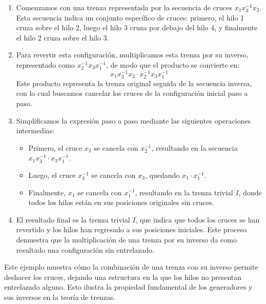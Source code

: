 \begin{enumerate}
    \item Comenzamos con una trenza representada por la secuencia de cruces \(x_1 x_3^{-1} x_2\). Esta secuencia indica un conjunto específico de cruces: primero, el hilo 1 cruza sobre el hilo 2, luego el hilo 3 cruza por debajo del hilo 4, y finalmente el hilo 2 cruza sobre el hilo 3.

    \item Para revertir esta configuración, multiplicamos esta trenza por su inverso, representado como \(x_2^{-1} x_3 x_1^{-1}\), de modo que el producto se convierte en:
    \[
    x_1 x_3^{-1} x_2 \cdot x_2^{-1} x_3 x_1^{-1}
    \]
    Este producto representa la trenza original seguida de la secuencia inversa, con lo cual buscamos cancelar los cruces de la configuración inicial paso a paso.

    \item Simplificamos la expresión paso a paso mediante las siguientes operaciones intermedias:
    
    \begin{itemize}
        \item Primero, el cruce \(x_2\) se cancela con \(x_2^{-1}\), resultando en la secuencia \(x_1 x_3^{-1} \cdot x_3 x_1^{-1}\).
        \item Luego, el cruce \(x_3^{-1}\) se cancela con \(x_3\), quedando \(x_1 \cdot x_1^{-1}\).
        \item Finalmente, \(x_1\) se cancela con \(x_1^{-1}\), resultando en la trenza trivial \(I\), donde todos los hilos están en sus posiciones originales sin cruces.
    \end{itemize}

    \item El resultado final es la trenza trivial \(I\), que indica que todos los cruces se han revertido y los hilos han regresado a sus posiciones iniciales. Este proceso demuestra que la multiplicación de una trenza por su inverso da como resultado una configuración sin entrelazado.
\end{enumerate}

Este ejemplo muestra cómo la combinación de una trenza con su inverso permite deshacer los cruces, dejando una estructura en la que los hilos no presentan entrelazado alguno. Esto ilustra la propiedad fundamental de los generadores y sus inversos en la teoría de trenzas.

\newpage


